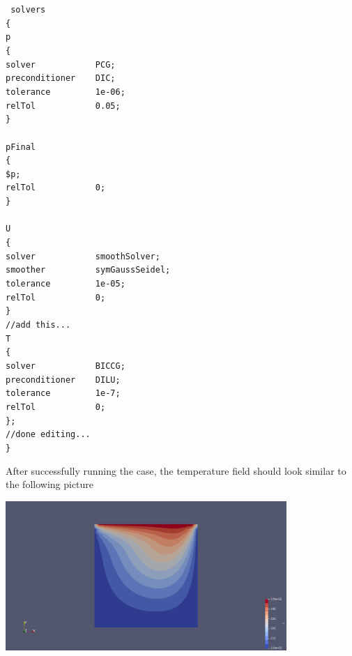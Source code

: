 \documentclass{article}
\newcommand\tab[1][0.5cm]{\hspace*{#1}}
\begin{document}
\begin{enumerate}
	\begin{myframe}
	{\tt %
	solvers\\
	\{\\
    \tab  p\\
	\tab \{\\
	\tab \tab solver~~~~~~~~~~~~PCG;\\
	\tab \tab preconditioner~~~~DIC;\\
	\tab \tab tolerance~~~~~~~~~1e-06;\\
	\tab \tab relTol~~~~~~~~~~~~0.05;\\
	\tab \}\\
	\\
	\tab pFinal\\
	\tab \{\\
	\tab \tab\$p;\\
	\tab \tab relTol~~~~~~~~~~~~0;\\
	\tab \}\\
	\\
	\tab U\\
	\tab \{\\
	\tab \tab solver~~~~~~~~~~~~smoothSolver;\\
	\tab \tab smoother~~~~~~~~~~symGaussSeidel;\\
	\tab \tab tolerance~~~~~~~~~1e-05;\\
	\tab \tab relTol~~~~~~~~~~~~0;\\
	\tab \}\\
	\tab //add this...\\
	\tab T \\
	\tab \{\\
	\tab \tab solver~~~~~~~~~~~~BICCG;\\
	\tab \tab preconditioner~~~~DILU;\\
	\tab \tab tolerance~~~~~~~~~1e-7;\\
	\tab \tab relTol~~~~~~~~~~~~0;\\
	\tab \};\\
	\tab //done editing...\\
	\}
	}
	\end{myframe}


	After successfully running the case, the temperature field should look similar to the following picture
	
	\begin{center}
		\includegraphics[width = 0.8\textwidth]{temp.png}
	\end{center}
	

\end{enumerate}
\end{document}
